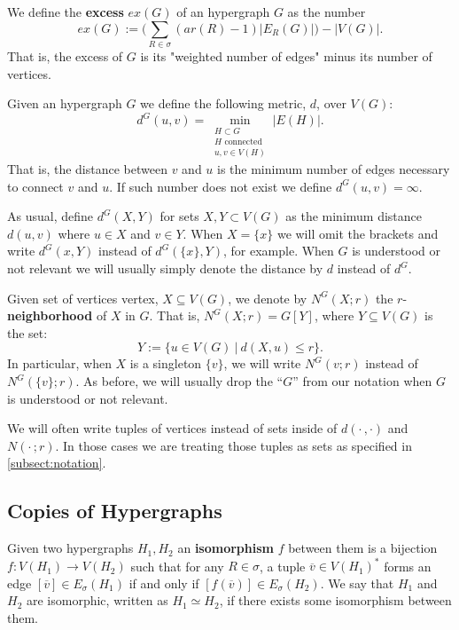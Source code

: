 \documentclass[12pt,notitlepage,a4paper]{article}
\theoremstyle{definition}
\begin{document}
We define the \textbf{excess} $ex(G)$ of an hypergraph $G$ as the number
\[
ex(G):= \big(\sum_{R\in \sigma} (ar(R)-1)|E_R(G)|\big) - |V(G)|.  
\] 
That is, the excess of $G$ is its "weighted number of edges"
minus its number of vertices. \par

Given an hypergraph $G$ we define the following metric, $d$, over $V(G)$:
\[ d^G(u,v)= \min_{\substack{H \subset G\\ 
		H \text{ connected }\\
		u,v\in V(H)}} |E(H)| .\]
That is, the distance between $v$ and $u$ is the minimum number of
edges necessary to connect $v$ and $u$. 
If such number does not exist we define $d^G(u,v)=\infty$. \par
As usual, define $d^{G}(X,Y)$ for sets $X,Y\subset V(G)$ as the minimum
distance $d(u,v)$ where $u\in X$ and $v\in Y$. 
When $X=\{x\}$ we will omit the brackets and write
$d^G(x,Y)$ instead of $d^G(\{x\},Y)$, for example.
When $G$ 
is understood or not relevant we will usually simply denote the 
distance by $d$ instead of $d^G$. \par

Given set of vertices vertex, $X\subseteq V(G)$, 
we denote by $N^G(X;r)$ the $r$-\textbf{neighborhood} of $X$ in 
$G$. That is,  $N^G(X;r)= G[Y]$, where $Y\subseteq V(G)$ is 
the set:
\[ Y:= \{ u \in V(G) \ | \ d(X,u)\leq r   \}. \]
In particular, when $X$ is a singleton $\{v\}$, we
will write $N^G(v;r)$ instead of $N^G(\{v\};r)$.
As before, we will usually drop the ``$G$'' from our 
notation when $G$ is understood or not relevant.  \par

We will often write tuples of vertices instead of sets
inside of $d(\cdot\, , \cdot)$ and $N(\cdot\, ;r)$. In those cases
we are treating those tuples as sets as specified in
\cref{subsect:notation}. 

\subsection{Copies of Hypergraphs}

Given two hypergraphs $H_1, H_2$ an \textbf{isomorphism} 
$f$ between them is a bijection $f: V(H_1)\rightarrow V(H_2)$
such that for any $R\in \sigma$, a tuple $\overline{v}\in V(H_1)^*$
forms an edge $[\overline{v}]\in E_\sigma(H_1)$ if and only
if $[f(\overline{v})]\in E_\sigma(H_2)$. We say that $H_1$ and
$H_2$ are isomorphic, written as $H_1\simeq H_2$, if there exists
some isomorphism between them.\par
\end{document}
